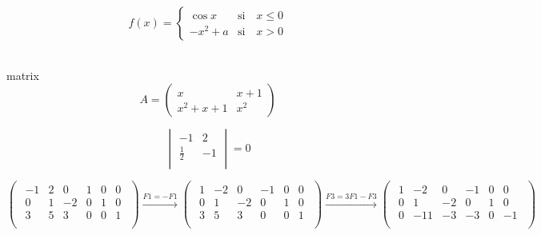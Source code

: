 $$f(x) = 
\begin{cases}
\cos x & \text{si } \text{ } x \leq 0\\
-x^2+a  & \text{si } \text{ } x > 0
\end{cases}
$$

\\matrix
$$A = 
\begin{pmatrix}
x & x+1 \\
x^{2}+x+1 & x^{2}
\end{pmatrix}
$$


$$
\begin{vmatrix} 
-1 & 2\\
\frac{1}{2} & -1\\
\end{vmatrix}=0 
$$


$$
\begin{pmatrix}
\begin{array}{ccc|ccc}
-1 & 2 & 0 &1&0&0\\
0 & 1 & -2 &0&1&0\\
3&5&3&0&0&1\\
\end{array} 
\end{pmatrix}

\xrightarrow{F1=-F1}

\begin{pmatrix}
\begin{array}{ccc|ccc}
1 & -2 & 0 &-1&0&0\\
0 & 1 & -2 &0&1&0\\
3&5&3&0&0&1\\
\end{array} 
\end{pmatrix}


\xrightarrow{F3=3F1-F3}

\begin{pmatrix}
\begin{array}{ccc|ccc}
1 & -2 & 0 &-1&0&0\\
0 & 1 & -2 &0&1&0\\
0&-11&-3&-3&0&-1\\
\end{array} 
\end{pmatrix}

$$



